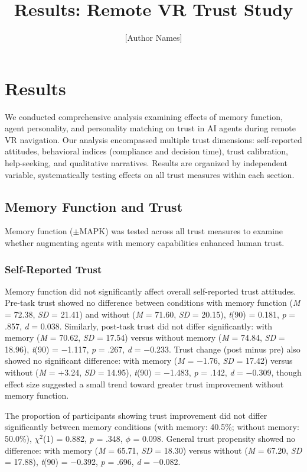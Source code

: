\documentclass[12pt]{article}
\title{\textbf{Results: Remote VR Trust Study}}
\author{[Author Names]}
\date{}
\begin{document}
\maketitle

\section{Results}

We conducted comprehensive analysis examining effects of memory function, agent personality, and personality matching on trust in AI agents during remote VR navigation. Our analysis encompassed multiple trust dimensions: self-reported attitudes, behavioral indices (compliance and decision time), trust calibration, help-seeking, and qualitative narratives. Results are organized by independent variable, systematically testing effects on all trust measures within each section.

\subsection{Memory Function and Trust}

Memory function ($\pm$MAPK) was tested across all trust measures to examine whether augmenting agents with memory capabilities enhanced human trust.

\subsubsection{Self-Reported Trust}

Memory function did not significantly affect overall self-reported trust attitudes. Pre-task trust showed no difference between conditions with memory function (\textit{M} = 72.38, \textit{SD} = 21.41) and without (\textit{M} = 71.60, \textit{SD} = 20.15), \textit{t}(90) = 0.181, \textit{p} = .857, \textit{d} = 0.038. Similarly, post-task trust did not differ significantly: with memory (\textit{M} = 70.62, \textit{SD} = 17.54) versus without memory (\textit{M} = 74.84, \textit{SD} = 18.96), \textit{t}(90) = $-$1.117, \textit{p} = .267, \textit{d} = $-$0.233. Trust change (post minus pre) also showed no significant difference: with memory (\textit{M} = $-$1.76, \textit{SD} = 17.42) versus without (\textit{M} = +3.24, \textit{SD} = 14.95), \textit{t}(90) = $-$1.483, \textit{p} = .142, \textit{d} = $-$0.309, though effect size suggested a small trend toward greater trust improvement without memory function.

The proportion of participants showing trust improvement did not differ significantly between memory conditions (with memory: 40.5\%; without memory: 50.0\%), $\chi^2$(1) = 0.882, \textit{p} = .348, $\phi$ = 0.098. General trust propensity showed no difference: with memory (\textit{M} = 65.71, \textit{SD} = 18.30) versus without (\textit{M} = 67.20, \textit{SD} = 17.88), \textit{t}(90) = $-$0.392, \textit{p} = .696, \textit{d} = $-$0.082.
\end{document}
